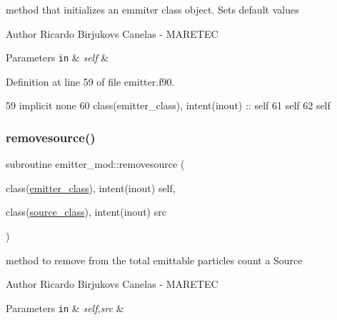 method that initializes an emmiter class object. Sets default values 

\begin{DoxyAuthor}{Author}
Ricardo Birjukovs Canelas -\/ M\+A\+R\+E\+T\+EC
\end{DoxyAuthor}

\begin{DoxyParams}[1]{Parameters}
\mbox{\tt in}  & {\em self} & \\
\hline
\end{DoxyParams}


Definition at line 59 of file emitter.\+f90.


\begin{DoxyCode}
59     \textcolor{keywordtype}{implicit none}
60     \textcolor{keywordtype}{class}(emitter\_class), \textcolor{keywordtype}{intent(inout)} :: self
61     self%
62     self%
\end{DoxyCode}
\mbox{\label{namespaceemitter__mod_a49b704640270da1c4fad50fcd5374376}} 
\subsubsection{\texorpdfstring{removesource()}{removesource()}}
{\footnotesize\ttfamily subroutine emitter\+\_\+mod\+::removesource (\begin{DoxyParamCaption}\item[{class(\mbox{\hyperlink{structemitter__mod_1_1emitter__class}{emitter\+\_\+class}}), intent(inout)}]{self,  }\item[{class(\mbox{\hyperlink{structsources__mod_1_1source__class}{source\+\_\+class}}), intent(inout)}]{src }\end{DoxyParamCaption})\hspace{0.3cm}{\ttfamily [private]}}



method to remove from the total emittable particles count a Source 

\begin{DoxyAuthor}{Author}
Ricardo Birjukovs Canelas -\/ M\+A\+R\+E\+T\+EC
\end{DoxyAuthor}

\begin{DoxyParams}[1]{Parameters}
\mbox{\tt in}  & {\em self,src} & \\
\hline
\end{DoxyParams}


